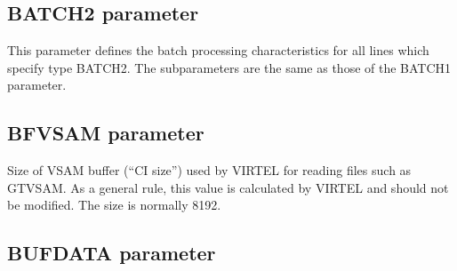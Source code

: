 \documentclass[letterpaper,10pt,english]{sphinxmanual}
\begin{document}
\subsection{BATCH2 parameter}
\label{\detokenize{Installation_Guide:batch2-parameter}}\label{\detokenize{Installation_Guide:index-39}}
\begin{sphinxVerbatim}[commandchars=\\\{\}]
    
\end{sphinxVerbatim}

\sphinxAtStartPar
This parameter defines the batch processing characteristics for all lines which specify type BATCH2. The subparameters are the same as those of the BATCH1 parameter.

\ignorespaces 

\subsection{BFVSAM parameter}
\label{\detokenize{Installation_Guide:bfvsam-parameter}}\label{\detokenize{Installation_Guide:index-40}}
\begin{sphinxVerbatim}[commandchars=\\\{\}]
 
\end{sphinxVerbatim}

\sphinxAtStartPar
{} \sphinxhyphen{} Size of VSAM buffer (“CI size”) used by VIRTEL for reading files such as GTVSAM. As a general rule, this value is calculated by VIRTEL and should not be modified. The size is normally 8192.

\ignorespaces 

\subsection{BUFDATA parameter}
\label{\detokenize{Installation_Guide:bufdata-parameter}}\label{\detokenize{Installation_Guide:index-41}}
\begin{sphinxVerbatim}[commandchars=\\\{\}]
 
\end{sphinxVerbatim}
\end{document}
